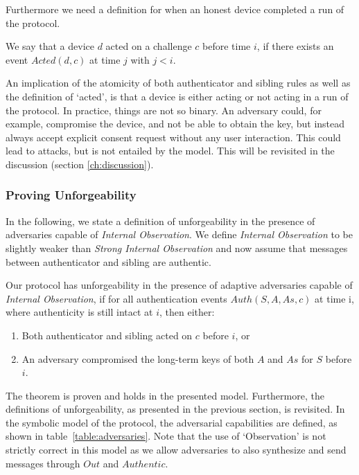 Furthermore we need a definition for when an honest device completed a run of the protocol.
\begin{definition}
We say that a device $d$ acted on a challenge $c$ before time $i$, if there exists an event $Acted(d,c)$ at time $j$ with $j < i$.
\end{definition}

An implication of the atomicity of both authenticator and sibling rules as well as the definition of `acted',  is that a device is either acting or not acting in a run of the protocol. In practice, things are not so binary. An adversary could, for example, compromise the device, and not be able to obtain the key, but instead always accept explicit consent request without any user interaction. This could lead to attacks, but is not entailed by the model. This will be revisited in the discussion (section \ref{ch:discussion}).
\subsubsection{Proving Unforgeability}
In the following, we state a definition of unforgeability in the presence of adversaries capable of \textit{Internal Observation}. We define \textit{Internal Observation} to be slightly weaker than \textit{Strong Internal Observation} and now assume that messages between \gls{authenticator} and \gls{sibling} are authentic. 

\begin{theorem}
Our protocol has unforgeability in the presence of adaptive adversaries capable of \textit{Internal Observation}, if for all authentication events $Auth(S,A,As,c)$ at time i, where authenticity is still intact at $i$, then either:
\begin{enumerate}
    \item Both authenticator and sibling acted on $c$ before $i$, or
    \item An adversary compromised the long-term keys of both $A$ and $As$ for $S$ before $i$.
\end{enumerate}
\end{theorem}

The theorem is proven and holds in the presented model. Furthermore, the definitions of unforgeability, as presented in the previous section, is revisited. In the symbolic model of the protocol, the adversarial capabilities are defined, as shown in table~\ref{table:adversaries}. Note that the use of `Observation' is not strictly correct in this model as we allow adversaries to also synthesize and send messages through $Out$ and $Authentic$.


